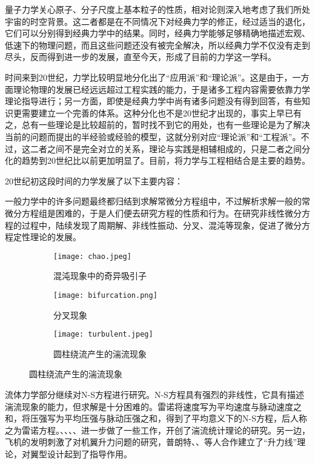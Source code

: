 量子力学关心原子、分子尺度上基本粒子的性质，相对论则深入地考虑了我们所处宇宙的时空背景。这二者都是在不同情况下对经典力学的修正，经过适当的退化，它们可以分别得到经典力学中的结果。同时，经典力学能够足够精确地描述宏观、低速下的物理问题，而且这些问题还没有被完全解决，所以经典力学不仅没有走到尽头，反而得到进一步的发展，直至今天，形成了目前的力学这一学科。

时间来到20世纪，力学比较明显地分化出了“应用派”和“理论派”。这是由于，一方面理论物理的发展已经远远超过工程实践的能力，于是诸多工程内容需要依靠力学理论指导进行；另一方面，即使是经典力学中尚有诸多问题没有得到回答，有些知识更需要建立一个完善的体系。这种分化也不是20世纪才出现的，事实上早已有之，总有一些理论是比较超前的，暂时找不到它的用处，也有一些理论是为了解决当前的问题而提出的半经验或经验的模型，这就分别对应“理论派”和“工程派”。不过，这二者之间不是完全对立的关系，理论与实践是相辅相成的，只是二者之间分化的趋势到20世纪比以前更加明显了。目前，将力学与工程相结合是主要的趋势。

20世纪初这段时间的力学发展了以下主要内容：

一般力学中的许多问题最终都归结到求解常微分方程组中，不过解析求解一般的常微分方程组是困难的，于是人们便去研究方程的性质和行为。在研究非线性微分方程的过程中，陆续发现了周期解、非线性振动、分叉、混沌等现象，促进了微分方程定性理论的发展。

\begin{figure}[ht]
    \centering
    \begin{subfigure}[t]{0.45\textwidth} \centering
        \texttt{[image: chao.jpeg]}
        \caption{混沌现象中的奇异吸引子}
    \end{subfigure}\quad
    \begin{subfigure}[t]{0.45\textwidth} \centering
        \texttt{[image: bifurcation.png]}
        \caption{分叉现象}
    \end{subfigure}\bigskip

    \begin{subfigure}[t]{0.45\textwidth} \centering
        \texttt{[image: turbulent.jpeg]}
        \caption{圆柱绕流产生的湍流现象}
    \end{subfigure}
\end{figure}


流体力学部分继续对N-S方程进行研究。N-S方程具有强烈的非线性，它具有描述湍流现象的能力，但求解是十分困难的。雷诺将速度写为平均速度与脉动速度之和，将压强写为平均压强与脉动压强之和，得到了平均意义下的N-S方程，后人称之为雷诺方程。、、、、进一步做了一些工作，开创了湍流统计理论的研究。另一边，飞机的发明刺激了对机翼升力问题的研究，普朗特、、等人合作建立了“升力线”理论，对翼型设计起到了指导作用。

